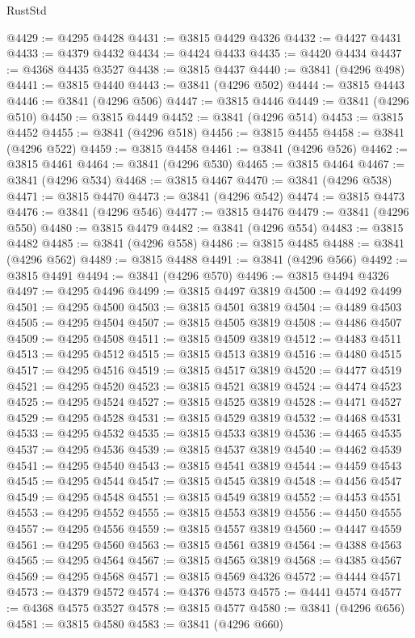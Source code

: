 \begin{lexlean}{RustStd}
\begin{coremodule}
@4429 := @4295 @4428
@4431 := @3815 @4429 @4326
@4432 := @4427 @4431
@4433 := @4379 @4432
@4434 := @4424 @4433
@4435 := @4420 @4434
@4437 := @4368 @4435 @3527
@4438 := @3815 @4437
@4440 := @3841 (@4296 @498)
@4441 := @3815 @4440
@4443 := @3841 (@4296 @502)
@4444 := @3815 @4443
@4446 := @3841 (@4296 @506)
@4447 := @3815 @4446
@4449 := @3841 (@4296 @510)
@4450 := @3815 @4449
@4452 := @3841 (@4296 @514)
@4453 := @3815 @4452
@4455 := @3841 (@4296 @518)
@4456 := @3815 @4455
@4458 := @3841 (@4296 @522)
@4459 := @3815 @4458
@4461 := @3841 (@4296 @526)
@4462 := @3815 @4461
@4464 := @3841 (@4296 @530)
@4465 := @3815 @4464
@4467 := @3841 (@4296 @534)
@4468 := @3815 @4467
@4470 := @3841 (@4296 @538)
@4471 := @3815 @4470
@4473 := @3841 (@4296 @542)
@4474 := @3815 @4473
@4476 := @3841 (@4296 @546)
@4477 := @3815 @4476
@4479 := @3841 (@4296 @550)
@4480 := @3815 @4479
@4482 := @3841 (@4296 @554)
@4483 := @3815 @4482
@4485 := @3841 (@4296 @558)
@4486 := @3815 @4485
@4488 := @3841 (@4296 @562)
@4489 := @3815 @4488
@4491 := @3841 (@4296 @566)
@4492 := @3815 @4491
@4494 := @3841 (@4296 @570)
@4496 := @3815 @4494 @4326
@4497 := @4295 @4496
@4499 := @3815 @4497 @3819
@4500 := @4492 @4499
@4501 := @4295 @4500
@4503 := @3815 @4501 @3819
@4504 := @4489 @4503
@4505 := @4295 @4504
@4507 := @3815 @4505 @3819
@4508 := @4486 @4507
@4509 := @4295 @4508
@4511 := @3815 @4509 @3819
@4512 := @4483 @4511
@4513 := @4295 @4512
@4515 := @3815 @4513 @3819
@4516 := @4480 @4515
@4517 := @4295 @4516
@4519 := @3815 @4517 @3819
@4520 := @4477 @4519
@4521 := @4295 @4520
@4523 := @3815 @4521 @3819
@4524 := @4474 @4523
@4525 := @4295 @4524
@4527 := @3815 @4525 @3819
@4528 := @4471 @4527
@4529 := @4295 @4528
@4531 := @3815 @4529 @3819
@4532 := @4468 @4531
@4533 := @4295 @4532
@4535 := @3815 @4533 @3819
@4536 := @4465 @4535
@4537 := @4295 @4536
@4539 := @3815 @4537 @3819
@4540 := @4462 @4539
@4541 := @4295 @4540
@4543 := @3815 @4541 @3819
@4544 := @4459 @4543
@4545 := @4295 @4544
@4547 := @3815 @4545 @3819
@4548 := @4456 @4547
@4549 := @4295 @4548
@4551 := @3815 @4549 @3819
@4552 := @4453 @4551
@4553 := @4295 @4552
@4555 := @3815 @4553 @3819
@4556 := @4450 @4555
@4557 := @4295 @4556
@4559 := @3815 @4557 @3819
@4560 := @4447 @4559
@4561 := @4295 @4560
@4563 := @3815 @4561 @3819
@4564 := @4388 @4563
@4565 := @4295 @4564
@4567 := @3815 @4565 @3819
@4568 := @4385 @4567
@4569 := @4295 @4568
@4571 := @3815 @4569 @4326
@4572 := @4444 @4571
@4573 := @4379 @4572
@4574 := @4376 @4573
@4575 := @4441 @4574
@4577 := @4368 @4575 @3527
@4578 := @3815 @4577
@4580 := @3841 (@4296 @656)
@4581 := @3815 @4580
@4583 := @3841 (@4296 @660)

\end{coremodule}
\end{lexlean}
